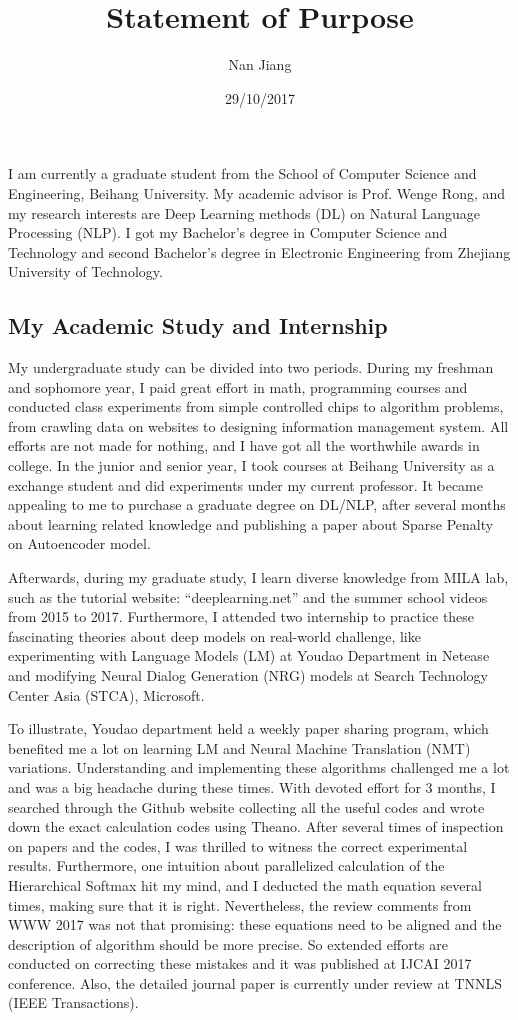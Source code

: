\documentclass[16pt，letterpaper]{ctexart}
\title{Statement of Purpose}
\author{Nan Jiang}
\date{29/10/2017}
\begin{document}
  \maketitle%
  \thispagestyle{empty}
  \vspace{12pt}


I am currently a graduate student from the School of Computer Science and Engineering, Beihang University. My academic advisor is Prof. Wenge Rong, and my research interests are Deep Learning methods (DL) on Natural Language Processing (NLP). I got my Bachelor's degree in Computer Science and Technology and second Bachelor's degree in Electronic Engineering from Zhejiang University of Technology.


\subsection{My Academic Study and Internship}
My undergraduate study can be divided into two periods. During my freshman and sophomore year, I paid great effort in math, programming courses and conducted class experiments from simple controlled chips to algorithm problems, from crawling data on websites to designing information management system. All efforts are not made for nothing, and I have got all the worthwhile awards in college. In the junior and senior year, I took courses at Beihang University as a exchange student and did experiments under my current professor. It became appealing to me to purchase a graduate degree on DL/NLP, after several months about learning related knowledge and publishing a paper about Sparse Penalty on Autoencoder model.

Afterwards, during my graduate study, I learn diverse knowledge from MILA lab, such as the tutorial website: ``deeplearning.net'' and the summer school videos from 2015 to 2017. Furthermore, I attended two internship to practice these fascinating theories about deep models on real-world challenge, like experimenting with Language Models (LM) at Youdao Department in Netease and modifying Neural Dialog Generation (NRG) models at Search Technology Center Asia (STCA), Microsoft.

To illustrate, Youdao department held a weekly paper sharing program, which benefited me a lot on learning LM and Neural Machine Translation (NMT) variations. Understanding and implementing these algorithms challenged me a lot and was a big headache during these times. With devoted effort for 3 months, I searched through the Github website collecting all the useful codes and wrote down the exact calculation codes using Theano. After several times of inspection on papers and the codes, I was thrilled to witness the correct experimental results. Furthermore, one intuition about parallelized calculation of the Hierarchical Softmax hit my mind, and I deducted the math equation several times, making sure that it is right. Nevertheless, the review comments from WWW 2017 was not that promising: these equations need to be aligned and the description of algorithm should be more precise. So extended efforts are conducted on correcting these mistakes and it was published at IJCAI 2017 conference. Also, the detailed journal paper is currently under review at TNNLS (IEEE Transactions).
\end{document}
